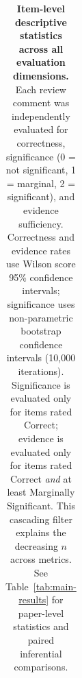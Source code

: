 \begin{table}[t]
\begin{tabular}{l cc c cc cc c cccc cc c cc cc}
\bottomrule
\end{tabular}
\caption{\textbf{Item-level descriptive statistics across all evaluation dimensions.}
Each review comment was independently evaluated for correctness, significance (0 = not significant, 1 = marginal, 2 = significant), and evidence sufficiency.
Correctness and evidence rates use Wilson score 95\% confidence intervals; significance uses non-parametric bootstrap confidence intervals (10{,}000 iterations).
Significance is evaluated only for items rated Correct; evidence is evaluated only for items rated Correct \emph{and} at least Marginally Significant.
This cascading filter explains the decreasing $n$ across metrics.
See Table~\ref{tab:main-results} for paper-level statistics and paired inferential comparisons.
}
\label{tab:ext-itemlevel}
\end{table}
